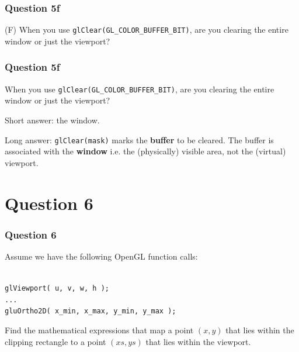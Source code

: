 \documentclass{beamer}
\begin{document}
\begin{frame}
    \frametitle{Question 5f}

    (F) When you use \texttt{glClear(GL\_COLOR\_BUFFER\_BIT)},
    are you clearing the entire window or just the viewport?
\end{frame}

\begin{frame}
    \frametitle{Question 5f}

    When you use \texttt{glClear(GL\_COLOR\_BUFFER\_BIT)},
    are you clearing the entire window or just the viewport?

    \begin{tcolorbox}
        Short answer: the window.

        Long answer: \texttt{glClear(mask)} marks the \textbf{buffer} to be cleared.
        The buffer is associated with the \textbf{window} i.e. the (physically) visible area, 
        not the (virtual) viewport.
    \end{tcolorbox}
\end{frame}

\section{Question 6}

\begin{frame}
    \frametitle{Question 6}

    Assume we have the following OpenGL function calls:

    \begin{tcolorbox}
        \texttt{\\
            glViewport( u, v, w, h ); \\
            ... \\
            gluOrtho2D( x\_min, x\_max, y\_min, y\_max );\\
        }
    \end{tcolorbox}

    Find the mathematical expressions that map a point $(x, y)$ that lies within the 
    clipping rectangle to a point $(xs, ys)$ that lies within the viewport.
\end{frame}
\end{document}

